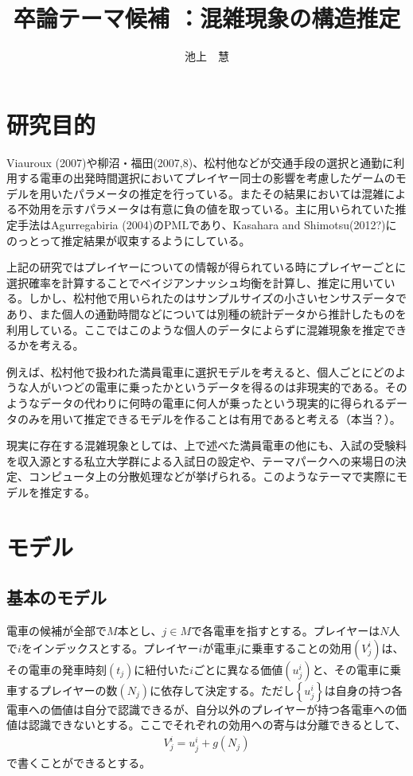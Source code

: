\documentclass{jsarticle}
\begin{document}
\title{卒論テーマ候補 ：混雑現象の構造推定}
\author{池上　慧}
\maketitle

\section{研究目的}
Viauroux (2007)や柳沼・福田(2007,8)、松村他などが交通手段の選択と通勤に利用する電車の出発時間選択においてプレイヤー同士の影響を考慮したゲームのモデルを用いたパラメータの推定を行っている。またその結果においては混雑による不効用を示すパラメータは有意に負の値を取っている。主に用いられていた推定手法はAgurregabiria (2004)のPMLであり、Kasahara and Shimotsu(2012?)にのっとって推定結果が収束するようにしている。

上記の研究ではプレイヤーについての情報が得られている時にプレイヤーごとに選択確率を計算することでベイジアンナッシュ均衡を計算し、推定に用いている。しかし、松村他で用いられたのはサンプルサイズの小さいセンサスデータであり、また個人の通勤時間などについては別種の統計データから推計したものを利用している。ここではこのような個人のデータによらずに混雑現象を推定できるかを考える。

例えば、松村他で扱われた満員電車に選択モデルを考えると、個人ごとにどのような人がいつどの電車に乗ったかというデータを得るのは非現実的である。そのようなデータの代わりに何時の電車に何人が乗ったという現実的に得られるデータのみを用いて推定できるモデルを作ることは有用であると考える（本当？）。

現実に存在する混雑現象としては、上で述べた満員電車の他にも、入試の受験料を収入源とする私立大学群による入試日の設定や、テーマパークへの来場日の決定、コンピュータ上の分散処理などが挙げられる。このようなテーマで実際にモデルを推定する。

\section{モデル}
\subsection{基本のモデル}
電車の候補が全部で$M$本とし、$j \in M$で各電車を指すとする。プレイヤーは$N$人で$i$をインデックスとする。プレイヤー$i$が電車$j$に乗車することの効用$(V_j^i)$は、その電車の発車時刻$(t_j)$に紐付いた$i$ごとに異なる価値$(u_j^i)$と、その電車に乗車するプレイヤーの数$(N_j)$に依存して決定する。ただし$\left\{u_j^i\right\}$は自身の持つ各電車への価値は自分で認識できるが、自分以外のプレイヤーが持つ各電車への価値は認識できないとする。ここでそれぞれの効用への寄与は分離できるとして、
\begin{align*}
	V_j^i = u_j^i + g(N_j)
\end{align*}
で書くことができるとする。
\end{document}
